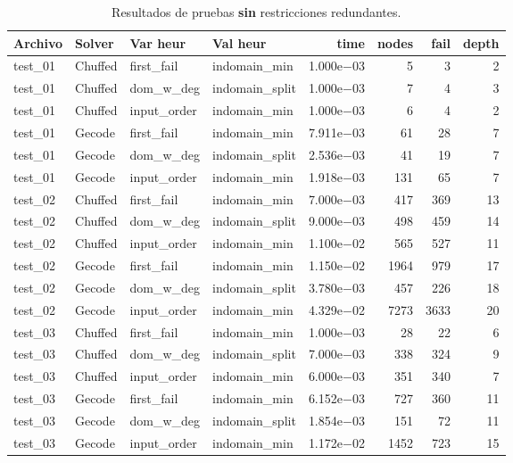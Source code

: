 \begin{compactfloats}
\begin{table}[H]
  \centering
  \small
  \setlength{\tabcolsep}{1.8pt}
  \caption{Resultados de pruebas \textbf{sin} restricciones redundantes.}
  \label{tab:pruebas-sudoku-off}
  \begin{tabular}{l l l l r r r r}
    \toprule
    \textbf{Archivo} & \textbf{Solver} & \textbf{Var heur} & \textbf{Val heur} & \textbf{time} & \textbf{nodes} & \textbf{fail} & \textbf{depth} \\
    \midrule
    test\_01 & Chuffed & first\_fail  & indomain\_min   & 1.000e$-$03 & 5    & 3    & 2 \\
    test\_01 & Chuffed & dom\_w\_deg  & indomain\_split & 1.000e$-$03 & 7    & 4    & 3 \\
    test\_01 & Chuffed & input\_order & indomain\_min   & 1.000e$-$03 & 6    & 4    & 2 \\
    test\_01 & Gecode  & first\_fail  & indomain\_min   & 7.911e$-$03 & 61   & 28   & 7 \\
    test\_01 & Gecode  & dom\_w\_deg  & indomain\_split & 2.536e$-$03 & 41   & 19   & 7 \\
    test\_01 & Gecode  & input\_order & indomain\_min   & 1.918e$-$03 & 131  & 65   & 7 \\
    \midrule
    test\_02 & Chuffed & first\_fail  & indomain\_min   & 7.000e$-$03 & 417  & 369  & 13 \\
    test\_02 & Chuffed & dom\_w\_deg  & indomain\_split & 9.000e$-$03 & 498  & 459  & 14 \\
    test\_02 & Chuffed & input\_order & indomain\_min   & 1.100e$-$02 & 565  & 527  & 11 \\
    test\_02 & Gecode  & first\_fail  & indomain\_min   & 1.150e$-$02 & 1964 & 979  & 17 \\
    test\_02 & Gecode  & dom\_w\_deg  & indomain\_split & 3.780e$-$03 & 457  & 226  & 18 \\
    test\_02 & Gecode  & input\_order & indomain\_min   & 4.329e$-$02 & 7273 & 3633 & 20 \\
    \midrule
    test\_03 & Chuffed & first\_fail  & indomain\_min   & 1.000e$-$03 & 28   & 22   & 6 \\
    test\_03 & Chuffed & dom\_w\_deg  & indomain\_split & 7.000e$-$03 & 338  & 324  & 9 \\
    test\_03 & Chuffed & input\_order & indomain\_min   & 6.000e$-$03 & 351  & 340  & 7 \\
    test\_03 & Gecode  & first\_fail  & indomain\_min   & 6.152e$-$03 & 727  & 360  & 11 \\
    test\_03 & Gecode  & dom\_w\_deg  & indomain\_split & 1.854e$-$03 & 151  & 72   & 11 \\
    test\_03 & Gecode  & input\_order & indomain\_min   & 1.172e$-$02 & 1452 & 723  & 15 \\
    \bottomrule
  \end{tabular}
\end{table}
\end{compactfloats}

\FloatBarrier
